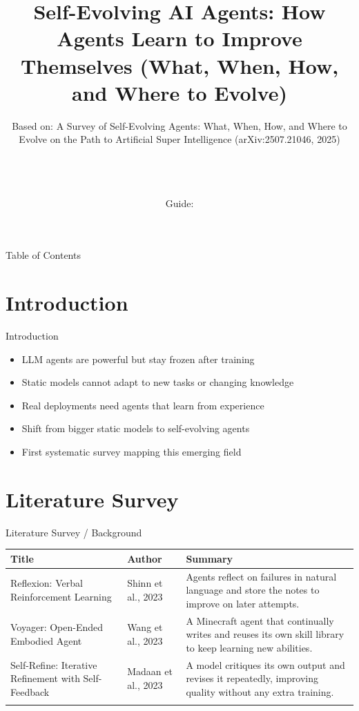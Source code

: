 \documentclass[10pt]{beamer}
\title[B.Tech Seminar]{Self-Evolving AI Agents: How Agents Learn to Improve Themselves (What, When, How, and Where to Evolve)}
\subtitle{Based on: A Survey of Self-Evolving Agents: What, When, How, and Where to Evolve on the Path to Artificial Super Intelligence (arXiv:2507.21046, 2025)}
\author[\studentname\ (\shortinst)]{\studentname \\ \small \rollno \\ \small \rollclass \\ \small Guide: \guidename}
\institute[]{\deptname \\ \collegename}
\date{\seminardate}
\begin{document}
\begin{frame}[plain]
  \titlepage
\end{frame}

\begin{frame}{Table of Contents}
  \tableofcontents
\end{frame}

\section{Introduction}
\begin{frame}{Introduction}
\begin{itemize}
  \item LLM agents are powerful but stay frozen after training
  \item Static models cannot adapt to new tasks or changing knowledge
  \item Real deployments need agents that learn from experience
  \item Shift from bigger static models to self-evolving agents
  \item First systematic survey mapping this emerging field
\end{itemize}
\end{frame}

\section{Literature Survey}
\begin{frame}{Literature Survey / Background}
  \small
  \begin{tabular}{@{}p{2.7cm}p{2.3cm}p{5.6cm}@{}}
    \toprule
    \textbf{Title} & \textbf{Author} & \textbf{Summary} \\
    \midrule
    Reflexion: Verbal Reinforcement Learning & Shinn et al., 2023 & Agents reflect on failures in natural language and store the notes to improve on later attempts. \\
    \addlinespace
    Voyager: Open-Ended Embodied Agent & Wang et al., 2023 & A Minecraft agent that continually writes and reuses its own skill library to keep learning new abilities. \\
    \addlinespace
    Self-Refine: Iterative Refinement with Self-Feedback & Madaan et al., 2023 & A model critiques its own output and revises it repeatedly, improving quality without any extra training. \\
    \addlinespace
    \bottomrule
  \end{tabular}
\end{frame}
\end{document}
